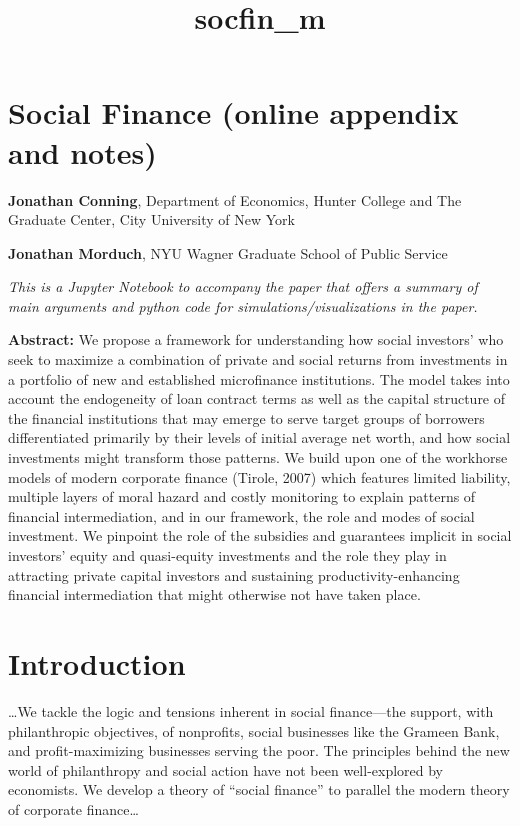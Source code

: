 \documentclass[11pt]{article}
\title{socfin\_m}
\begin{document}
    
    \maketitle
    
    

    
    \section{Social Finance (online appendix and
notes)}\label{social-finance-online-appendix-and-notes}

\textbf{Jonathan Conning}, Department of Economics, Hunter College and
The Graduate Center, City University of New York

\textbf{Jonathan Morduch}, NYU Wagner Graduate School of Public Service

    \emph{This is a Jupyter Notebook to accompany the paper that offers a
summary of main arguments and python code for simulations/visualizations
in the paper.}

    \textbf{Abstract:} We propose a framework for understanding how social
investors' who seek to maximize a combination of private and social
returns from investments in a portfolio of new and established
microfinance institutions. The model takes into account the endogeneity
of loan contract terms as well as the capital structure of the financial
institutions that may emerge to serve target groups of borrowers
differentiated primarily by their levels of initial average net worth,
and how social investments might transform those patterns. We build upon
one of the workhorse models of modern corporate finance (Tirole, 2007)
which features limited liability, multiple layers of moral hazard and
costly monitoring to explain patterns of financial intermediation, and
in our framework, the role and modes of social investment. We pinpoint
the role of the subsidies and guarantees implicit in social investors'
equity and quasi-equity investments and the role they play in attracting
private capital investors and sustaining productivity-enhancing
financial intermediation that might otherwise not have taken place.

    \section{Introduction}\label{introduction}

\ldots We tackle the logic and tensions inherent in social finance---the
support, with philanthropic objectives, of nonprofits, social businesses
like the Grameen Bank, and profit-maximizing businesses serving the
poor. The principles behind the new world of philanthropy and social
action have not been well-explored by economists. We develop a theory of
``social finance'' to parallel the modern theory of corporate
finance\ldots{}
\end{document}
